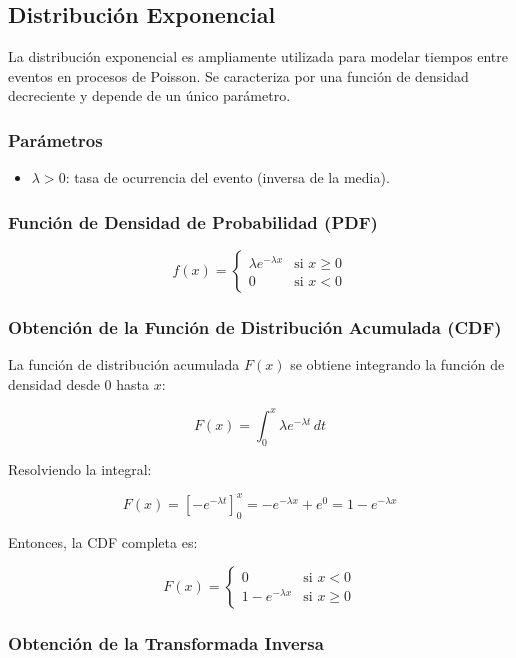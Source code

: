 \documentclass{article}
\begin{document}
\subsection{Distribución Exponencial}

La distribución exponencial es ampliamente utilizada para modelar tiempos entre eventos en procesos de Poisson. Se caracteriza por una función de densidad decreciente y depende de un único parámetro.

\subsubsection*{Parámetros}

\begin{itemize}
  \item $\lambda > 0$: tasa de ocurrencia del evento (inversa de la media).
\end{itemize}

\subsubsection*{Función de Densidad de Probabilidad (PDF)}

\[
f(x) =
\begin{cases}
\lambda e^{-\lambda x} & \text{si } x \geq 0 \\
0 & \text{si } x < 0
\end{cases}
\]

\subsubsection*{Obtención de la Función de Distribución Acumulada (CDF)}

La función de distribución acumulada $F(x)$ se obtiene integrando la función de densidad desde 0 hasta $x$:

\[
F(x) = \int_0^x \lambda e^{-\lambda t} \, dt
\]

Resolviendo la integral:

\[
F(x) = \left[ -e^{-\lambda t} \right]_0^x = -e^{-\lambda x} + e^0 = 1 - e^{-\lambda x}
\]

Entonces, la CDF completa es:

\[
F(x) =
\begin{cases}
0 & \text{si } x < 0 \\
1 - e^{-\lambda x} & \text{si } x \geq 0
\end{cases}
\]

\subsubsection*{Obtención de la Transformada Inversa}
\end{document}
